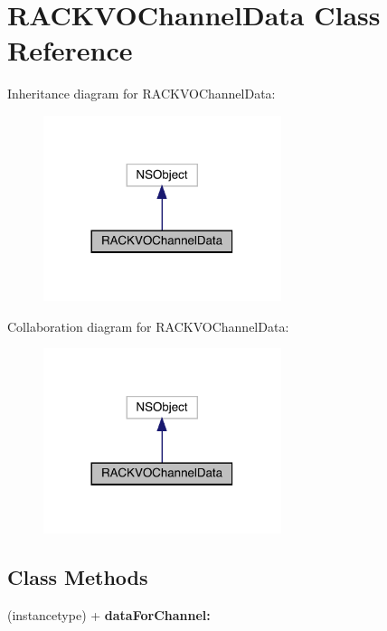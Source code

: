 \hypertarget{interface_r_a_c_k_v_o_channel_data}{}\section{R\+A\+C\+K\+V\+O\+Channel\+Data Class Reference}
\label{interface_r_a_c_k_v_o_channel_data}


Inheritance diagram for R\+A\+C\+K\+V\+O\+Channel\+Data\+:\nopagebreak
\begin{figure}[H]
\begin{center}
\leavevmode
\includegraphics[width=197pt]{interface_r_a_c_k_v_o_channel_data__inherit__graph}
\end{center}
\end{figure}


Collaboration diagram for R\+A\+C\+K\+V\+O\+Channel\+Data\+:\nopagebreak
\begin{figure}[H]
\begin{center}
\leavevmode
\includegraphics[width=197pt]{interface_r_a_c_k_v_o_channel_data__coll__graph}
\end{center}
\end{figure}
\subsection*{Class Methods}
\begin{DoxyCompactItemize}
\item 
\mbox{\label{interface_r_a_c_k_v_o_channel_data_aeed5840fc9800ed174c412c2c296e14f}} 
(instancetype) + {\bfseries data\+For\+Channel\+:}
\end{DoxyCompactItemize}
